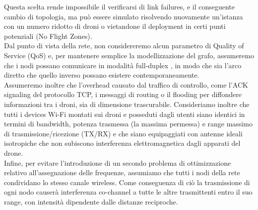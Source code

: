 Questa scelta rende impossibile il verificarsi di link failures, e il conseguente cambio di topologia, ma può essere simulato risolvendo nuovamente un'istanza con un numero ridotto di droni o vietandone il deployment in certi punti potenziali (No Flight Zones). \\
Dal punto di vista della rete, non considereremo alcun parametro di Quality of Service (QoS) \cite{6686488} e, per mantenere semplice la modellizzazione del grafo, assumeremo che i nodi possano comunicare in modalità full-duplex \cite{6262501}, in modo che sia l'arco diretto che quello inverso possano esistere contemporaneamente.  \\
Assumeremo inoltre che l'overhead causato dal traffico di controllo, come l'ACK signaling del protocollo TCP, i messaggi di routing o il flooding per diffondere informazioni tra i droni, sia di dimensione trascurabile. 
Consideriamo inoltre che tutti i devices Wi-Fi montati sui droni e posseduti dagli utenti siano identici in termini di bandwidth, potenza trasmessa (la massima permessa) e range massimo di trasmissione/ricezione (TX/RX) e che siano equipaggiati con antenne ideali isotropiche \cite{zennaro2004radio} che non subiscono interferenza elettromagnetica dagli apparati del drone. \\
Infine, per evitare l'introduzione di un secondo problema di ottimizzazione relativo all'assegnazione delle frequenze, assumiamo che tutti i nodi della rete condividano lo stesso canale wireless. 
Come conseguenza di ciò la trasmissione di ogni nodo causerà interferenza co-channel \cite{arokiamary2009cellular} a tutte le altre trasmittenti entro il suo range, con intensità dipendente dalle distanze reciproche.
 





